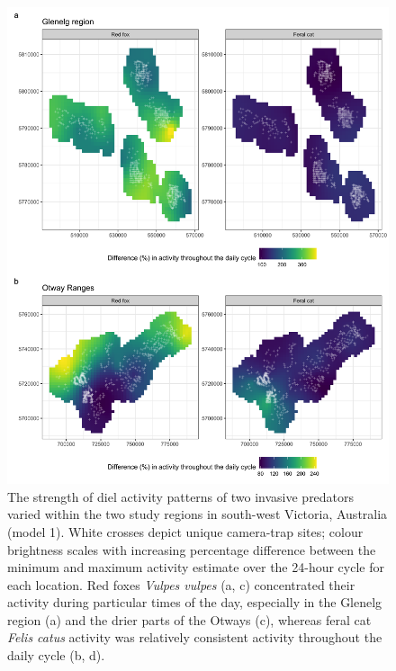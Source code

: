 \documentclass[]{elsarticle} %
\begin{document}
\begin{figure}

{\centering \includegraphics[width=1\linewidth]{../figs/diel_strength_600dpi} 

}

\caption{The strength of diel activity patterns of two invasive predators varied within the two study regions in south-west Victoria, Australia (model 1). White crosses depict unique camera-trap sites; colour brightness scales with increasing percentage difference between the minimum and maximum activity estimate over the 24-hour cycle for each location. Red foxes \textit{Vulpes vulpes} (a, c) concentrated their activity during particular times of the day, especially in the Glenelg region (a) and the drier parts of the Otways (c), whereas feral cat \textit{Felis catus} activity was relatively consistent activity throughout the daily cycle (b, d).}\label{fig:diel-space}
\end{figure}

\newpage
\end{document}
